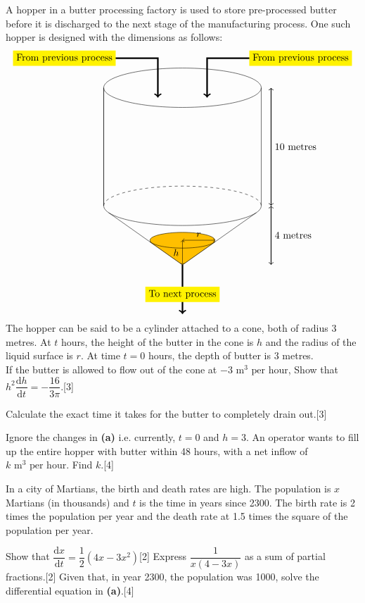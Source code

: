 \documentclass[12pt, a4 paper]{article}
\begin{document}
\begin{outline}[enumerate]
\1 A hopper in a butter processing factory is used to store pre-processed butter before it is discharged to the next stage of the manufacturing process. One such hopper is designed with the dimensions as follows: %
\[
\begin{tikzpicture}
    \draw (0,0) ellipse (80pt and 20pt); %
		\draw (-80pt,0) -- (-80pt,-120pt);
		\draw (80pt,0) -- (80pt,-120pt);
		\draw (-80pt,0) -- (-80pt,-120pt);
		\draw[dashed] (-80pt,-120pt) arc (180:0:80pt and 20pt);
		\draw (-80pt,-120pt) arc (180:360:80pt and 20pt);
		\draw[<->,thick] (90pt,0) -- (90pt,-60pt) node[right] {10 metres} -- (90pt,-120pt);%
		\draw (-75pt,-127pt) -- (0, -180pt); %
		\draw (0,-180pt) -- (75pt,-127pt);
		\draw[<->,thick] (90pt,-120pt) -- (90pt,-150pt) node[right] {4 metres} -- (90pt,-180pt);%
		\draw[->,ultra thick] (-120pt,30pt) node [fill=yellow]{From previous process}-- (-25pt,30pt) -- (-25pt,-10pt); %
		\draw[->,ultra thick] (120pt,30pt) node [fill=yellow]{From previous process}-- (25pt,30pt) -- (25pt,-10pt);
		\draw[->,ultra thick] (0,-180pt) -- (0,-210pt) node[fill=yellow]{To next process} -- (0,-230pt); %
		\filldraw [orange!50!yellow,draw=black](0,-180pt) -- (33pt,-156.68pt) -- (-33pt,-156.68pt) -- cycle; %
		\filldraw [orange!50!yellow,draw=black](0,-155pt) ellipse (33pt and 8pt);
		\draw[<->] (0,-155pt) -- (16.5pt, -155pt) node [above]{$r$}-- (33pt,-155pt);
		\draw[<->] (0,-155pt) -- (0, -167.5pt) node [left]{$h$}-- (0,-180pt); %
\end{tikzpicture}
\]
The hopper can be said to be a cylinder attached to a cone, both of radius 3 metres. At $t$ hours, the height of the butter in the cone is $h$ and the radius of the liquid surface is $r$. At time $t = 0$ hours, the depth of butter is 3 metres.\\

If the butter is allowed to flow out of the cone at $- 3\textrm{ m}^3{\textrm{ per hour}}$,
	\2 Show that ${h^2}\dfrac{{{\mathrm{d}}h}}{{{\mathrm{d}}t}} =  - \dfrac{{16}}{{3\pi }}$.\hfill[3]

	\2 Calculate the exact time it takes for the butter to completely drain out.\hfill[3]

	\2 Ignore the changes in \textbf{(a)} i.e. currently, $t = 0$ and $h = 3$. An operator wants to fill up the entire hopper with butter within 48 hours, with a net inflow of $k\textrm{ m}^3{\textrm{ per hour}}$. Find $k$.\hfill[4]

\1 In a city of Martians, the birth and death rates are high. The population is $x$ Martians (in thousands) and $t$ is the time in years since 2300. The birth rate is 2 times the population per year and the death rate at 1.5 times the square of the population per year.

	\2 Show that $\dfrac{{{\textrm{d}}x}}{{{\textrm{d}}t}} = \dfrac{1}{2}(4x - 3{x^2})$\hfill[2]
	\2 Express $\dfrac{1}{{x(4 - 3x)}}$ as a sum of partial fractions.\hfill[2]
	\2 Given that, in year 2300, the population was 1000, solve the differential equation in \textbf{(a)}.\hfill[4]



\end{outline}
\end{document}
